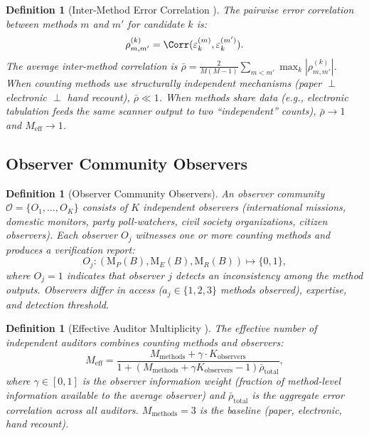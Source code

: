 \documentclass[11pt,a4paper]{article}
\newtheorem{definition}[theorem]{Definition}
\theoremstyle{definition}
\newcommand{\observerSet}{\mathcal{O}}
\newcommand{\method}[1]{\mathrm{M}_{#1}}
\begin{document}
\begin{definition}[Inter-Method Error Correlation ]
\label{def:inter_method_corr}
The pairwise error correlation between methods $m$ and $m'$ for candidate $k$ is:
\begin{equation}
    \rho_{m,m'}^{(k)} = \Corr(\varepsilon_k^{(m)}, \varepsilon_k^{(m')}).
    \label{eq:inter_corr}
\end{equation}
The average inter-method correlation is $\bar{\rho} = \frac{2}{M(M-1)} \sum_{m < m'} \max_k |\rho_{m,m'}^{(k)}|$. When counting methods use structurally independent mechanisms (paper $\perp$ electronic $\perp$ hand recount), $\bar{\rho} \ll 1$. When methods share data (e.g., electronic tabulation feeds the same scanner output to two ``independent'' counts), $\bar{\rho} \to 1$ and $M_{\text{eff}} \to 1$.
\end{definition}
\subsection{Observer Community Observers}
\begin{definition}[Observer Community Observers]
\label{def:observer_community}
An observer community $\observerSet = \{O_1, \ldots, O_K\}$ consists of $K$ independent observers (international missions, domestic monitors, party poll-watchers, civil society organizations, citizen observers). Each observer $O_j$ witnesses one or more counting methods and produces a verification report:
\begin{equation}
    O_j: (\method{P}(B), \method{E}(B), \method{R}(B)) \mapsto \{0, 1\},
    \label{eq:observer}
\end{equation}
where $O_j = 1$ indicates that observer $j$ detects an inconsistency among the method outputs. Observers differ in access ($a_j \in \{1, 2, 3\}$ methods observed), expertise, and detection threshold.
\end{definition}
\begin{definition}[Effective Auditor Multiplicity ]
\label{def:Meff}
The effective number of independent auditors combines counting methods and observers:
\begin{equation}
    M_{\text{eff}} = \frac{M_{\text{methods}} + \gamma \cdot K_{\text{observers}}}{1 + (M_{\text{methods}} + \gamma K_{\text{observers}} - 1) \bar{\rho}_{\text{total}}},
    \label{eq:Meff_total}
\end{equation}
where $\gamma \in [0, 1]$ is the observer information weight (fraction of method-level information available to the average observer) and $\bar{\rho}_{\text{total}}$ is the aggregate error correlation across all auditors. $M_{\text{methods}} = 3$ is the baseline (paper, electronic, hand recount).
\end{definition}
\end{document}
